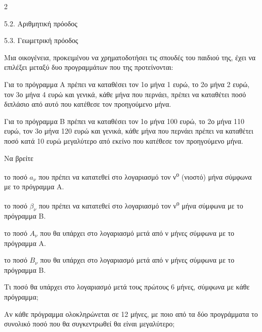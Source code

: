 \begin{ylh}{2}
    \item 5.2. Αριθμητική πρόοδος
    \item 5.3. Γεωμετρική πρόοδος
\end{ylh}
Μια οικογένεια, προκειμένου να χρηματοδοτήσει τις σπουδές του παιδιού της, έχει να επιλέξει μεταξύ δυο προγραμμάτων που της προτείνονται:

Για το πρόγραμμα Α πρέπει να καταθέσει τον 1ο μήνα 1 ευρώ, το 2ο μήνα 2 ευρώ, τον 3ο μήνα 4 ευρώ και γενικά, κάθε μήνα που περνάει, πρέπει να καταθέτει ποσό διπλάσιο από αυτό που κατέθεσε τον προηγούμενο μήνα.

Για το πρόγραμμα Β πρέπει να καταθέσει τον 1ο μήνα 100 ευρώ, το 2ο μήνα 110 ευρώ, τον 3ο μήνα 120 ευρώ και γενικά, κάθε μήνα που περνάει πρέπει να καταθέτει ποσό κατά 10 ευρώ μεγαλύτερο από εκείνο που κατέθεσε τον προηγούμενο μήνα.

\begin{alist}
\item Να βρείτε
\begin{rlist}
\item το ποσό $a_\nu$ που πρέπει να κατατεθεί στο λογαριασμό τον ν\textsuperscript{ο} (νιοστό) μήνα σύμφωνα με το πρόγραμμα Α.

\item το ποσό $\beta_\nu$ που πρέπει να κατατεθεί στο λογαριασμό τον ν\textsuperscript{ο} μήνα σύμφωνα με το πρόγραμμα Β.

\item το ποσό ${A}_\nu$ που θα υπάρχει στο λογαριασμό μετά από ν μήνες σύμφωνα με το πρόγραμμα Α.

\item το ποσό ${B}_\nu$ που θα υπάρχει στο λογαριασμό μετά από ν μήνες σύμφωνα με το πρόγραμμα Β.

\end{rlist}
\item
\begin{rlist}
\item Τι ποσό θα υπάρχει στο λογαριασμό μετά τους πρώτους 6 μήνες, σύμφωνα με κάθε πρόγραμμα;
\item Αν κάθε πρόγραμμα ολοκληρώνεται σε 12 μήνες, με ποιο από τα δύο προγράμματα το συνολικό ποσό που θα συγκεντρωθεί θα είναι μεγαλύτερο;
\end{rlist}
\end{alist}

